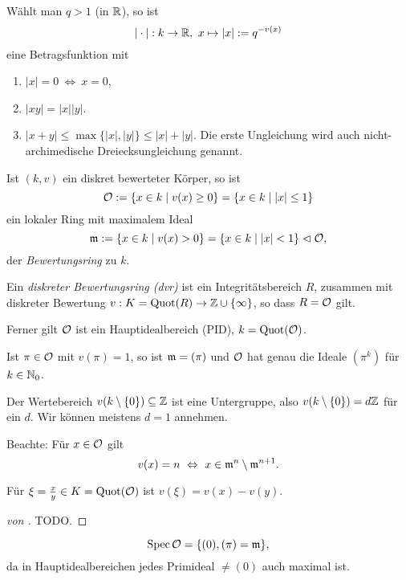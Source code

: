 \begin{bemerkung}
	Wählt man $q > 1$ (in $\mathbb{R}$), so ist
	\[
		|\cdot |: k \to \mathbb{R},\ x\mapsto |x| := q^{-v(x)}
	\]
	eine Betragsfunktion mit
	\begin{enumerate}
	  \item $|x| = 0 \ \Leftrightarrow\ x = 0$,
	  \item $|xy| = |x||y|$.
	  \item $|x+y| \leq \max \{ |x|,|y|\} \leq |x| + |y|$.
	   Die erste Ungleichung wird auch nicht-archimedische
	   Dreiecksungleichung genannt.
	\end{enumerate}
\end{bemerkung}


\begin{definition}[Bewertungsring]
	\label{def:bewertungsring}
	Ist $(k,v)$ ein diskret bewerteter Körper, so ist
	\[
		\mathcal{O}:= \{x\in k\mid v(x) \geq 0 \} = \{ x \in k \mid |x|\leq 1\}
	\]
	ein lokaler Ring mit maximalem Ideal
	\[
		\mathfrak{m} := \{x\in k\mid v(x) > 0\} = \{ x \in k\mid |x|< 1\} \vartriangleleft \mathcal{O},
	\]
	der \emph{Bewertungsring} zu $k$.
	
	Ein \emph{diskreter Bewertungsring (dvr)} ist ein Integritätsbereich $R$,
	zusammen mit diskreter Bewertung $v: K = \operatorname{Quot}(R) \to \mathbb{Z} \cup \{\infty\}$,
	so dass $R = \mathcal{O}$ gilt.
	
	Ferner gilt $\mathcal{O}$ ist ein Hauptidealbereich (PID), $k = \operatorname{Quot}(\mathcal{O})$.
	
	Ist $\pi\in \mathcal{O}$ mit $v(\pi) = 1$, so ist 
	$\mathfrak{m} = (\pi)$ und $\mathcal{O}$ hat genau die Ideale $(\pi^k)$ für $k\in \mathbb{N}_0$.
\end{definition}


\begin{bemerkung}
	Der Wertebereich $v(k\setminus \{0\}) \subseteq \mathbb{Z}$ ist eine Untergruppe,
	also $v(k\setminus \{0\}) = d \mathbb{Z}$ für ein $d$. 
	Wir können meistens \obda $d = 1$ annehmen.	
\end{bemerkung}

\begin{bemerkung}
	Beachte: Für $x\in \mathcal{O}$ gilt
	\[ v(x) = n \ \Leftrightarrow \ x \in \mathfrak{m}^n \setminus \mathfrak{m}^{n+1}. \]
	
	Für $\xi = \frac x y \in K = \operatorname{Quot}(\mathcal{O})$ ist $v(\xi) = v(x) - v(y)$.
\end{bemerkung}


\begin{proof}[von ]
	TODO.
\end{proof}

\begin{bemerkung}
	\[\operatorname{Spec} \mathcal{O} = \{(0), (\pi) = \mathfrak{m} \},\]
	da in Hauptidealbereichen jedes Primideal $\neq (0)$ auch maximal ist.
\end{bemerkung}

